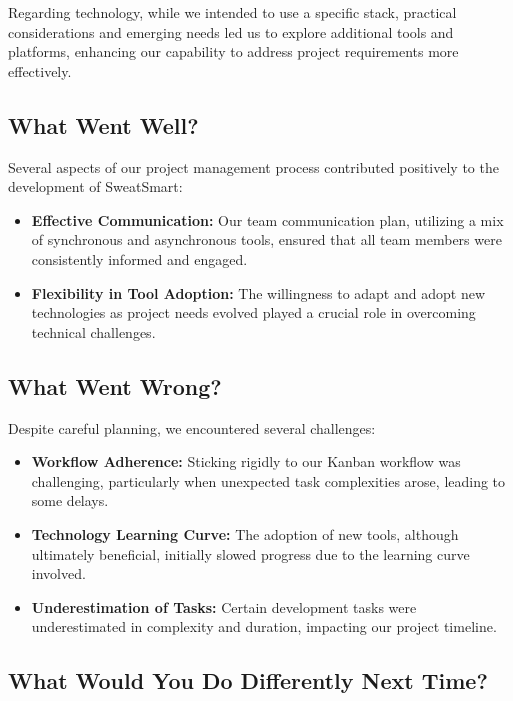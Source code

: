 \documentclass{article}
\begin{document}
Regarding technology, while we intended to use a specific stack, practical considerations and emerging needs led us to explore additional tools and platforms, enhancing our capability to address project requirements more effectively.

\subsection{What Went Well?}

Several aspects of our project management process contributed positively to the development of SweatSmart:

\begin{itemize}
    \item \textbf{Effective Communication:} Our team communication plan, utilizing a mix of synchronous and asynchronous tools, ensured that all team members were consistently informed and engaged.
    \item \textbf{Flexibility in Tool Adoption:} The willingness to adapt and adopt new technologies as project needs evolved played a crucial role in overcoming technical challenges.
\end{itemize}

\subsection{What Went Wrong?}

Despite careful planning, we encountered several challenges:

\begin{itemize}
    \item \textbf{Workflow Adherence:} Sticking rigidly to our Kanban workflow was challenging, particularly when unexpected task complexities arose, leading to some delays.
    \item \textbf{Technology Learning Curve:} The adoption of new tools, although ultimately beneficial, initially slowed progress due to the learning curve involved.
    \item \textbf{Underestimation of Tasks:} Certain development tasks were underestimated in complexity and duration, impacting our project timeline.
\end{itemize}

\subsection{What Would You Do Differently Next Time?}
\end{document}
